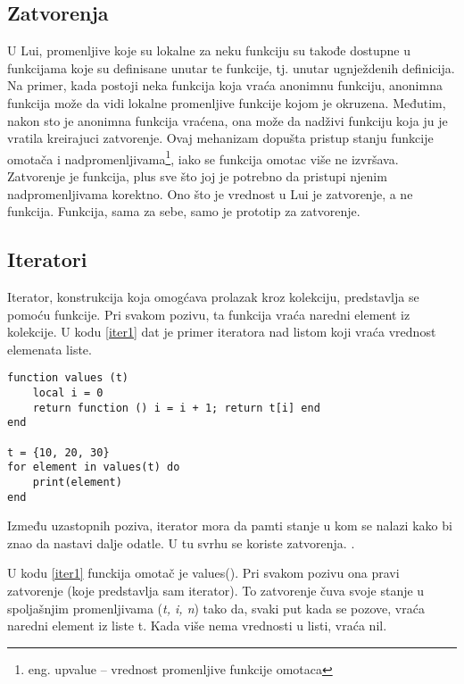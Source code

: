 \documentclass[a4paper]{article}
\begin{document}


\subsection{Zatvorenja}
\label{sec:zatvorenja}


U Lui, promenljive koje su lokalne za neku funkciju su takođe dostupne u funkcijama koje su definisane unutar te funkcije, tj. unutar ugnježdenih definicija. Na primer, kada postoji neka funkcija koja vraća anonimnu funkciju, anonimna funkcija može da vidi lokalne promenljive funkcije kojom je okruzena. Međutim, nakon sto je anonimna funkcija vraćena, ona može da nadživi funkciju koja ju je vratila kreirajuci zatvorenje. Ovaj mehanizam dopušta pristup stanju funkcije omotača i nadpromenljivama\footnote{eng. upvalue -- vrednost promenljive funkcije omotaca}, iako se funkcija omotac više ne izvršava.
Zatvorenje je funkcija, plus sve što joj je potrebno da pristupi njenim nadpromenljivama korektno. Ono što je vrednost u Lui je zatvorenje, a ne funkcija. Funkcija, sama za sebe, samo je prototip za zatvorenje.


\subsection{Iteratori}
\label{sec:iteratori}


Iterator, konstrukcija koja omogćava prolazak kroz kolekciju, predstavlja se pomoću funkcije. Pri svakom pozivu, ta funkcija vraća naredni element iz kolekcije. U kodu \ref{iter1} dat je primer iteratora nad listom koji vraća vrednost elemenata liste.

\begin{lstlisting}[caption={Primer iteratora nad listom},frame=single, label=iter1]
function values (t)
	local i = 0
	return function () i = i + 1; return t[i] end
end

t = {10, 20, 30}
for element in values(t) do
	print(element)
end
\end{lstlisting}

Između uzastopnih poziva, iterator mora da pamti stanje u kom se nalazi kako bi znao da nastavi dalje odatle. U tu svrhu se koriste zatvorenja. \cite{lua_org_iterators}.

U kodu \ref{iter1} funckija omotač je values(). Pri svakom pozivu ona pravi zatvorenje (koje predstavlja sam iterator). To zatvorenje čuva svoje stanje u spoljašnjim promenljivama (\textit{t, i, n}) tako da, svaki put kada se pozove, vraća naredni element iz liste t. Kada više nema vrednosti u listi, vraća nil.
\end{document}
